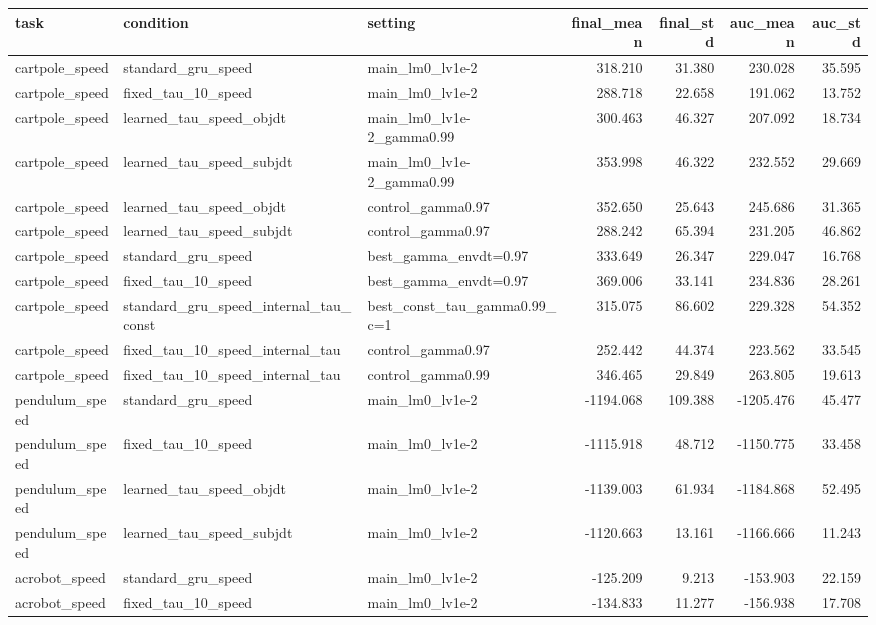 \begin{tabular}{lllrrrr}
\toprule
task & condition & setting & final_mean & final_std & auc_mean & auc_std \\
\midrule
cartpole_speed & standard_gru_speed & main_lm0_lv1e-2 & 318.210 & 31.380 & 230.028 & 35.595 \\
cartpole_speed & fixed_tau_10_speed & main_lm0_lv1e-2 & 288.718 & 22.658 & 191.062 & 13.752 \\
cartpole_speed & learned_tau_speed_objdt & main_lm0_lv1e-2_gamma0.99 & 300.463 & 46.327 & 207.092 & 18.734 \\
cartpole_speed & learned_tau_speed_subjdt & main_lm0_lv1e-2_gamma0.99 & 353.998 & 46.322 & 232.552 & 29.669 \\
cartpole_speed & learned_tau_speed_objdt & control_gamma0.97 & 352.650 & 25.643 & 245.686 & 31.365 \\
cartpole_speed & learned_tau_speed_subjdt & control_gamma0.97 & 288.242 & 65.394 & 231.205 & 46.862 \\
cartpole_speed & standard_gru_speed & best_gamma_envdt=0.97 & 333.649 & 26.347 & 229.047 & 16.768 \\
cartpole_speed & fixed_tau_10_speed & best_gamma_envdt=0.97 & 369.006 & 33.141 & 234.836 & 28.261 \\
cartpole_speed & standard_gru_speed_internal_tau_const & best_const_tau_gamma0.99_c=1 & 315.075 & 86.602 & 229.328 & 54.352 \\
cartpole_speed & fixed_tau_10_speed_internal_tau & control_gamma0.97 & 252.442 & 44.374 & 223.562 & 33.545 \\
cartpole_speed & fixed_tau_10_speed_internal_tau & control_gamma0.99 & 346.465 & 29.849 & 263.805 & 19.613 \\
pendulum_speed & standard_gru_speed & main_lm0_lv1e-2 & -1194.068 & 109.388 & -1205.476 & 45.477 \\
pendulum_speed & fixed_tau_10_speed & main_lm0_lv1e-2 & -1115.918 & 48.712 & -1150.775 & 33.458 \\
pendulum_speed & learned_tau_speed_objdt & main_lm0_lv1e-2 & -1139.003 & 61.934 & -1184.868 & 52.495 \\
pendulum_speed & learned_tau_speed_subjdt & main_lm0_lv1e-2 & -1120.663 & 13.161 & -1166.666 & 11.243 \\
acrobot_speed & standard_gru_speed & main_lm0_lv1e-2 & -125.209 & 9.213 & -153.903 & 22.159 \\
acrobot_speed & fixed_tau_10_speed & main_lm0_lv1e-2 & -134.833 & 11.277 & -156.938 & 17.708 \\

\end{tabular}
